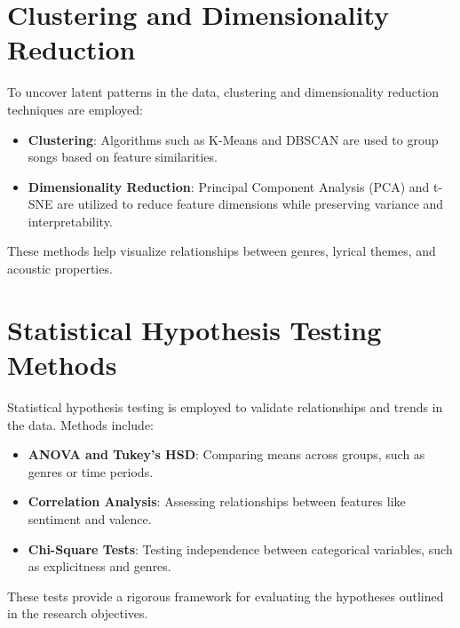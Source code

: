 
\section{Clustering and Dimensionality Reduction}
\label{sec:clusteringanddimensionalityreduction}

To uncover latent patterns in the data, clustering and dimensionality reduction techniques are employed:

\begin{itemize}
  \item \textbf{Clustering}: Algorithms such as K-Means and DBSCAN are used to group songs based on feature similarities.
  \item \textbf{Dimensionality Reduction}: Principal Component Analysis (PCA) and t-SNE are utilized to reduce feature dimensions while preserving variance and interpretability.
\end{itemize}

These methods help visualize relationships between genres, lyrical themes, and acoustic properties.


\section{Statistical Hypothesis Testing Methods}
\label{sec:statisticalhypothesistestingmethods}

Statistical hypothesis testing is employed to validate relationships and trends in the data. Methods include:

\begin{itemize}
  \item \textbf{ANOVA and Tukey's HSD}: Comparing means across groups, such as genres or time periods.
  \item \textbf{Correlation Analysis}: Assessing relationships between features like sentiment and valence.
  \item \textbf{Chi-Square Tests}: Testing independence between categorical variables, such as explicitness and genres.
\end{itemize}

These tests provide a rigorous framework for evaluating the hypotheses outlined in the research objectives.

